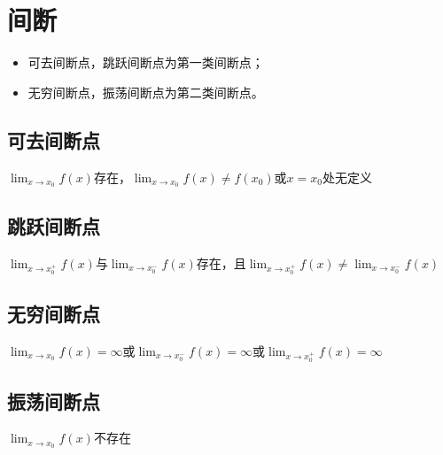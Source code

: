 \section{间断}
\begin{itemize}
    \item 可去间断点，跳跃间断点为第一类间断点；
    \item 无穷间断点，振荡间断点为第二类间断点。
\end{itemize}

\subsection{可去间断点}
\(\displaystyle \lim_{x \to x_0}f(x)\)存在，\(\displaystyle \lim_{x \to x_0}f(x) \neq f(x_0)\)或\(x = x_0\)处无定义

\subsection{跳跃间断点}
\(\displaystyle \lim_{x \to x_0^+}f(x)\)与\(\displaystyle \lim_{x \to x_0^-}f(x)\)存在，且\(\displaystyle \lim_{x \to x_0^+}f(x) \neq \displaystyle \lim_{x \to x_0^-}f(x)\)

\subsection{无穷间断点}
\(\displaystyle \lim_{x \to x_0}f(x) = \infty\)或\(\displaystyle \lim_{x \to x_0^-}f(x) = \infty\)或\(\displaystyle \lim_{x \to x_0^+}f(x) = \infty\)

\subsection{振荡间断点}
\(\displaystyle \lim_{x \to x_0}f(x)\)不存在









